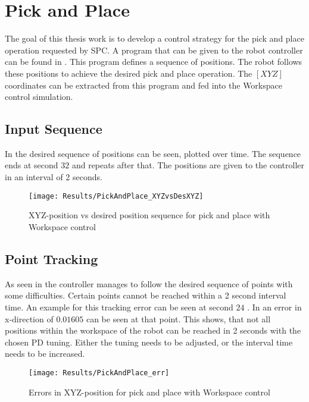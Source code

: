 
\section{Pick and Place}
The goal of this thesis work is to develop a control strategy for the pick and place operation requested by SPC. A program that can be given to the robot controller can be found in .
This program defines a sequence of positions. The robot follows these positions to achieve the desired pick and place operation.
The $ [XYZ] $ coordinates can be extracted from this program and fed into the Workspace control simulation.

\subsection{Input Sequence}
In  the desired sequence of positions can be seen, plotted over time. The sequence ends at second $32$ and repeats after that. The positions are given to the controller in an interval of 2 seconds.

\begin{figure}[h]
	\texttt{[image: Results/PickAndPlace\_XYZvsDesXYZ]}
	\caption{XYZ-position vs desired position sequence for pick and place with Workspace control}
	\label{fig:PickAndPlace_XYZvsDesXYZ}
\end{figure}


\subsection{Point Tracking}
As seen in  the controller manages to follow the desired sequence of points with some difficulties. Certain points cannot be reached within a 2 second interval time. An example for this tracking error can be seen at second $24$ . In  an error in x-direction of $0.01605$ can be seen at that point. 
This shows, that not all positions within the workspace of the robot can be reached in 2 seconds with the chosen PD tuning.
Either the tuning needs to be adjusted, or the interval time needs to be increased.

\begin{figure}[H]
	\texttt{[image: Results/PickAndPlace\_err]}
	\caption{Errors in XYZ-position for pick and place with Workspace control}
	\label{fig:PickAndPlace_err}
\end{figure}



